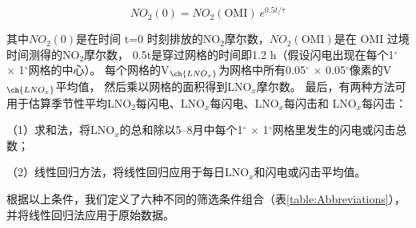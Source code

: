 \begin{equation} \label{eq:inition}
NO_2(0) = NO_2(\mathrm{OMI})\ e^{0.5t/\tau}
\end{equation}

其中$NO_2(0)$是在时间 t=0 时刻排放的NO$_2$摩尔数，$NO_2(\mathrm{OMI})$是在 OMI 过境时间测得的NO$_2$摩尔数，
0.5t是穿过网格的时间即1.2 h（假设闪电出现在每个1$^{\circ}$ $\times$ 1$^{\circ}$网格的中心）。
每个网格的V$_{\ch{LNO_x}}$为网格中所有0.05$^{\circ}$ $\times$ 0.05$^{\circ}$像素的V$_{\ch{LNO_x}}$平均值，
然后乘以网格的面积得到LNO$_x$摩尔数。
最后，有两种方法可用于估算季节性平均LNO$_2$每闪电、LNO$_x$每闪电、LNO$_x$每闪击和 LNO$_x$每闪击：

（1）求和法，将LNO$_x$的总和除以5--8月中每个1$^{\circ}$ $\times$ 1$^{\circ}$网格里发生的闪电或闪击总数；

（2）线性回归方法，将线性回归应用于每日LNO$_x$和闪电或闪击平均值。


根据以上条件，我们定义了六种不同的筛选条件组合（表\ref{table:Abbreviations}），并将线性回归法应用于原始数据。

